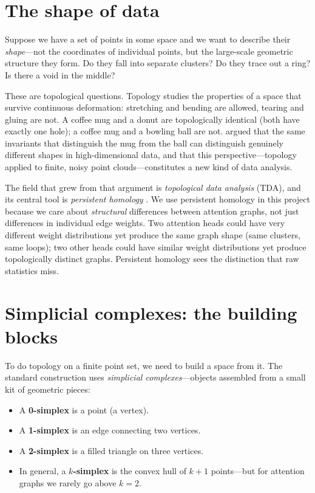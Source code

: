 \section{The shape of data}
\label{sec:shape-of-data}

Suppose we have a set of points in some space and we want to describe
their \emph{shape}---not the coordinates of individual points, but the
large-scale geometric structure they form. Do they fall into separate
clusters? Do they trace out a ring? Is there a void in the middle?

These are topological questions.
Topology studies the properties of a space that survive continuous
deformation: stretching and bending are allowed, tearing and gluing are
not.
A coffee mug and a donut are topologically identical (both have exactly
one hole); a coffee mug and a bowling ball are not.
\textcite{carlsson2009} argued that the same invariants that
distinguish the mug from the ball can distinguish genuinely different
shapes in high-dimensional data, and that this perspective---topology
applied to finite, noisy point clouds---constitutes a new kind of data
analysis.

The field that grew from that argument is \emph{topological data
analysis} (TDA), and its central tool is \emph{persistent homology}
\parencite{edelsbrunner2010, zomorodian2005}.
We use persistent homology in this project because we care about
\emph{structural} differences between attention graphs, not just
differences in individual edge weights.
Two attention heads could have very different weight distributions yet
produce the same graph shape (same clusters, same loops); two other
heads could have similar weight distributions yet produce topologically
distinct graphs.
Persistent homology sees the distinction that raw statistics miss.


\section{Simplicial complexes: the building blocks}
\label{sec:simplicial-complexes}

To do topology on a finite point set, we need to build a space from it.
The standard construction uses \emph{simplicial complexes}---objects
assembled from a small kit of geometric pieces:

\begin{itemize}
  \item A \textbf{0-simplex} is a point (a vertex).
  \item A \textbf{1-simplex} is an edge connecting two vertices.
  \item A \textbf{2-simplex} is a filled triangle on three vertices.
  \item In general, a \textbf{$k$-simplex} is the convex hull of $k+1$
        points---but for attention graphs we rarely go above $k = 2$.
\end{itemize}


